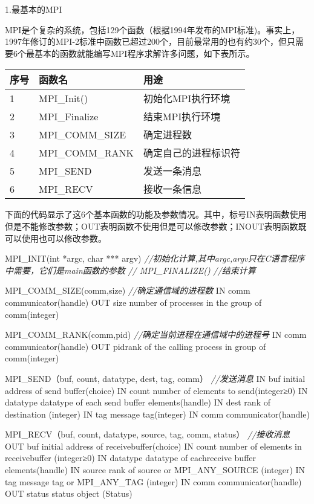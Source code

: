 \documentclass[]{ctexbook}
\newenvironment{Shaded}{\begin{snugshade}}{\end{snugshade}}
\newcommand{\CommentTok}[1]{\textcolor[rgb]{0.56,0.35,0.01}{\textit{#1}}}
\newcommand{\DataTypeTok}[1]{\textcolor[rgb]{0.13,0.29,0.53}{#1}}
\newcommand{\DecValTok}[1]{\textcolor[rgb]{0.00,0.00,0.81}{#1}}
\newcommand{\NormalTok}[1]{#1}
\begin{document}
1.最基本的MPI

MPI是个复杂的系统，包括129个函数（根据1994年发布的MPI标准)。事实上，1997年修订的MPI-2标准中函数已超过200个，目前最常用的也有约30个，但只需要6个最基本的函数就能编写MPI程序求解许多问题，如下表所示。

\begin{longtable}[]{@{}lll@{}}
\toprule
序号 & 函数名 & 用途\tabularnewline
\midrule
\endhead
1 & MPI\_Init() & 初始化MPI执行环境\tabularnewline
2 & MPI\_Finalize & 结束MPI执行环境\tabularnewline
3 & MPI\_COMM\_SIZE & 确定进程数\tabularnewline
4 & MPI\_COMM\_RANK & 确定自己的进程标识符\tabularnewline
5 & MPI\_SEND & 发送一条消息\tabularnewline
6 & MPI\_RECV & 接收一条信息\tabularnewline
\bottomrule
\end{longtable}

下面的代码显示了这6个基本函数的功能及参数情况。其中，标号IN表明函数使用但是不能修改参数；OUT表明函数不使用但是可以修改参数；INOUT表明函数既可以使用也可以修改参数。

\begin{Shaded}
\begin{Highlighting}[]
\NormalTok{MPI\_INIT(}\DataTypeTok{int}\NormalTok{ *argc, }\DataTypeTok{char}\NormalTok{ *** argv)}
\CommentTok{//初始化计算,其中argc,argv只在C语言程序中需要，它们是main函数的参数}
\CommentTok{// MPI\_FINALIZE()}
\CommentTok{//结束计算}

\NormalTok{MPI\_COMM\_SIZE(comm,size)}
\CommentTok{//确定通信域的进程数}
\NormalTok{IN   comm     communicator(handle)}
\NormalTok{OUT  size     number of processes in the group of comm(integer)}

\NormalTok{MPI\_COMM\_RANK(comm,pid)}
\CommentTok{//确定当前进程在通信域中的进程号}
\NormalTok{IN   comm     communicator(handle)}
\NormalTok{OUT  pidrank of the calling process in group of comm(integer)}

\NormalTok{MPI\_SEND（buf, count, datatype, dest, tag, comm）}
\CommentTok{//发送消息}
\NormalTok{IN   buf      initial address of send buffer(choice)}
\NormalTok{IN   count    number of elements to send(integer≥}\DecValTok{0}\NormalTok{)}
\NormalTok{IN   datatype datatype of each send buffer elements(handle)}
\NormalTok{IN   dest     rank of destination (integer)}
\NormalTok{IN   tag      message tag(integer)}
\NormalTok{IN   comm     communicator(handle)}

\NormalTok{MPI\_RECV（buf, count, datatype, source, tag, comm, status）}
\CommentTok{//接收消息}
\NormalTok{OUT  buf      initial address of receivebuffer(choice)}
\NormalTok{IN   count    number of elements in receivebuffer (integer≥}\DecValTok{0}\NormalTok{)}
\NormalTok{IN   datatype datatype of eachreceive buffer elements(handle)}
\NormalTok{IN   source   rank of source or MPI\_ANY\_SOURCE (integer)}
\NormalTok{IN   tag      message tag or MPI\_ANY\_TAG (integer)}
\NormalTok{IN   comm     communicator(handle)}
\NormalTok{OUT  status   status object (Status)}
\end{Highlighting}
\end{Shaded}
\end{document}
